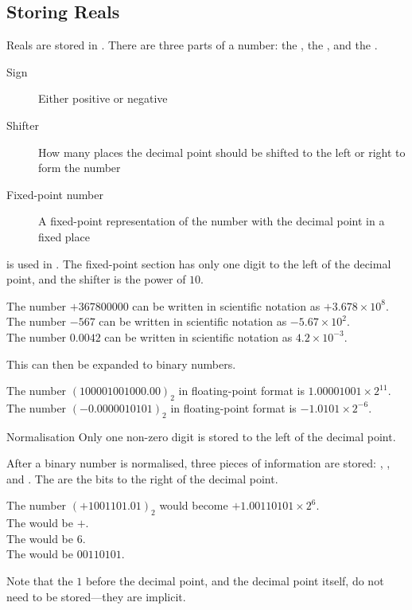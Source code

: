 \documentclass[../notes.tex]{subfiles}
\begin{document}
			\subsection{Storing Reals}
				Reals are stored in . There are three parts of a  number: the , the , and the .
				\begin{indentparagraph}
					\begin{description}
						\item[Sign] Either positive or negative
						\item[Shifter] How many places the decimal point should be shifted to the left or right to form the number
						\item[Fixed-point number] A fixed-point representation of the number with the decimal point in a fixed place
					\end{description}
				\end{indentparagraph}
				 is used in . The fixed-point section has only one digit to the left of the decimal point, and the shifter is the power of $10$.
				\begin{example}
					The number $+367800000$ can be written in scientific notation as $+3.678 \times 10^{8}$.\\
					The number $-567$ can be written in scientific notation as $-5.67 \times 10^{2}$.\\
					The number $0.0042$ can be written in scientific notation as $4.2 \times 10^{-3}$. 
				\end{example}
				This can then be expanded to binary numbers.
				\begin{example}
					The number $(100001001000.00)_{2}$ in floating-point format is $1.00001001 \times 2^{11}$.\\
					The number $(-0.0000010101)_{2}$ in floating-point format is $-1.0101 \times 2^{-6}$.
				\end{example}
				\begin{definition}{Normalisation}
					Only one non-zero digit is stored to the left of the decimal point.
				\end{definition}
				\pagebreak
				After a binary number is normalised, three pieces of information are stored: , , and . The  are the bits to the right of the decimal point.
				\begin{example}
					The number $(+1001101.01)_{2}$ would become $+ 1.00110101 \times 2^{6}$.\\
					The  would be $+$.\\
					The  would be $6$.\\
					The  would be $00110101$.
					\begin{indentparagraph}
						Note that the $1$ before the decimal point, and the decimal point itself, do not need to be stored---they are implicit.
					\end{indentparagraph}
				\end{example}
\end{document}
